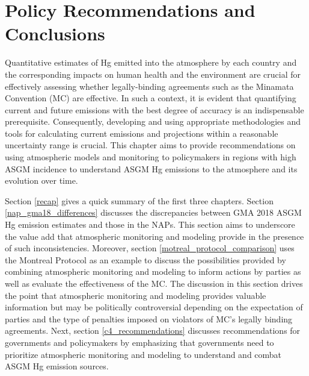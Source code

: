 
\chapter{Policy Recommendations and Conclusions}
\begin{flushleft}
Quantitative estimates of Hg emitted into the atmosphere by each country and the corresponding impacts on human health and the environment are crucial for effectively assessing whether legally-binding agreements such as the Minamata Convention (MC) are effective. In such a context, it is evident that quantifying current and future emissions with the best degree of accuracy is an indispensable prerequisite. Consequently, developing and using appropriate methodologies and tools for calculating current emissions and projections within a reasonable uncertainty range is crucial. This chapter aims to provide recommendations on using atmospheric models and monitoring to policymakers in regions with high ASGM incidence to understand ASGM Hg emissions to the atmosphere and its evolution over time. 

\begin{flushleft}
Section \ref{recap} gives a quick summary of the first three chapters. Section \ref{nap_gma18_differences} discusses the discrepancies between GMA 2018 ASGM Hg emission estimates and those in the NAPs. This section aims to underscore the value add that atmospheric monitoring and modeling provide in the presence of such inconsistencies. Moreover, section \ref{motreal_protocol_comparison} uses the Montreal Protocol as an example to discuss the possibilities provided by combining atmospheric monitoring and modeling to inform actions by parties as well as evaluate the effectiveness of the MC. The discussion in this section drives the point that atmospheric monitoring and modeling provides valuable information but may be politically controversial depending on the expectation of parties and the type of penalties imposed on violators of MC's legally binding agreements. Next, section \ref{c4_recommendations} discusses recommendations for governments and policymakers by emphasizing that governments need to prioritize atmospheric monitoring and modeling to understand and combat ASGM Hg emission sources.


\end{flushleft}
\end{flushleft}
